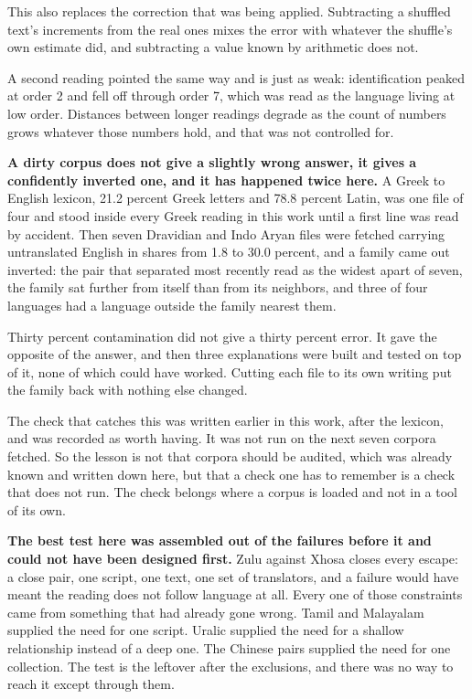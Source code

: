 This also replaces the correction that was being applied. Subtracting a shuffled text's increments from the real ones mixes the error with whatever the shuffle's own estimate did, and subtracting a value known by arithmetic does not.

A second reading pointed the same way and is just as weak: identification peaked at order 2 and fell off through order 7, which was read as the language living at low order. Distances between longer readings degrade as the count of numbers grows whatever those numbers hold, and that was not controlled for.

\textbf{A dirty corpus does not give a slightly wrong answer, it gives a confidently inverted one, and it has happened twice here.} A Greek to English lexicon, 21.2 percent Greek letters and 78.8 percent Latin, was one file of four and stood inside every Greek reading in this work until a first line was read by accident. Then seven Dravidian and Indo Aryan files were fetched carrying untranslated English in shares from 1.8 to 30.0 percent, and a family came out inverted: the pair that separated most recently read as the widest apart of seven, the family sat further from itself than from its neighbors, and three of four languages had a language outside the family nearest them.

Thirty percent contamination did not give a thirty percent error. It gave the opposite of the answer, and then three explanations were built and tested on top of it, none of which could have worked. Cutting each file to its own writing put the family back with nothing else changed.

The check that catches this was written earlier in this work, after the lexicon, and was recorded as worth having. It was not run on the next seven corpora fetched. So the lesson is not that corpora should be audited, which was already known and written down here, but that a check one has to remember is a check that does not run. The check belongs where a corpus is loaded and not in a tool of its own.

\textbf{The best test here was assembled out of the failures before it and could not have been designed first.} Zulu against Xhosa closes every escape: a close pair, one script, one text, one set of translators, and a failure would have meant the reading does not follow language at all. Every one of those constraints came from something that had already gone wrong. Tamil and Malayalam supplied the need for one script. Uralic supplied the need for a shallow relationship instead of a deep one. The Chinese pairs supplied the need for one collection. The test is the leftover after the exclusions, and there was no way to reach it except through them.

